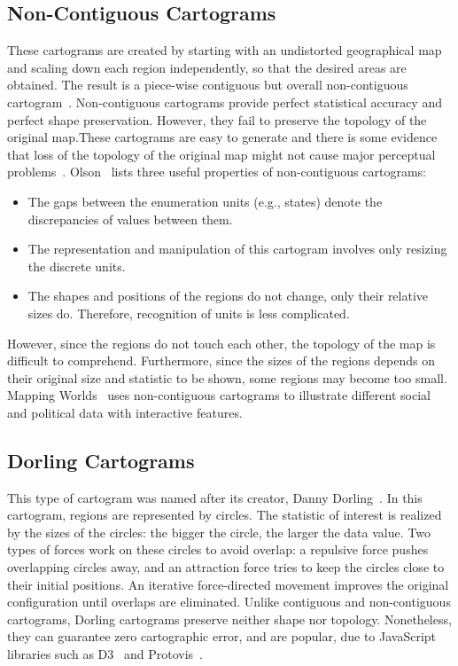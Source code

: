 \documentclass{egpubl}
\begin{document}
\subsection{Non-Contiguous Cartograms}
These cartograms are created by starting with an undistorted geographical map and scaling down each region independently, so that the desired areas are obtained. 
The result is a piece-wise contiguous but overall non-contiguous cartogram~\cite{Olson}. Non-contiguous cartograms provide perfect statistical accuracy and perfect shape preservation. However, they fail to preserve the topology of the original map.These cartograms are easy to generate and there is some evidence that loss of the topology of the original map might not cause major perceptual problems~\cite{KPN05}. Olson~\cite{Olson} lists three useful properties of non-contiguous cartograms: 
\begin{itemize}
\item The gaps between the enumeration units (e.g., states) denote the discrepancies of values between them.
\item The representation and manipulation of this cartogram involves only resizing the discrete units.
\item The shapes and positions of the regions do not change, only their relative sizes do. Therefore, recognition of units is less complicated.
\end{itemize}

However, since the regions do not touch each other, the topology of the map is difficult to comprehend. Furthermore, since the sizes of the regions depends on their original size and statistic to be shown, some regions may become too small. Mapping Worlds~\cite{non_c} uses non-contiguous cartograms to illustrate different social and political data with interactive features.


\subsection{Dorling Cartograms}
This type of cartogram was named after its creator, Danny Dorling~\cite{dorling96}. In this cartogram, regions are represented by circles. The statistic of interest is realized by the sizes of the circles: the bigger the circle, the larger the data value. Two types of forces work on these circles to avoid overlap: a repulsive force pushes overlapping circles away, and an attraction force tries to keep the circles close to their initial positions. An iterative force-directed movement improves the original configuration until overlaps are eliminated. 
Unlike contiguous and non-contiguous cartograms, Dorling cartograms preserve neither shape nor topology. Nonetheless, they can guarantee zero cartographic error, and are popular, due to
JavaScript libraries such as D3~\cite{bostock2011d3, D3} and Protovis~\cite{Proto}. 
\end{document}

